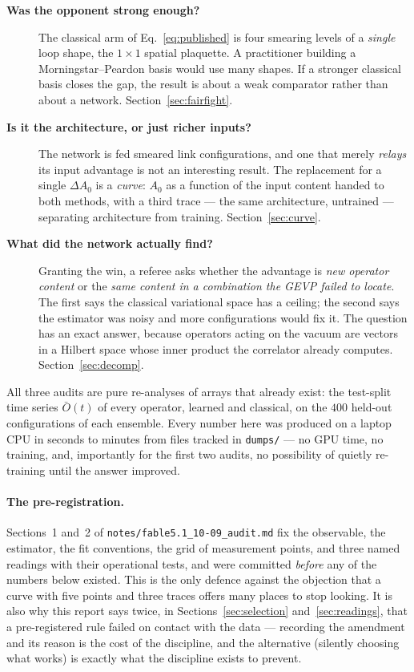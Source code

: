 \documentclass[11pt,a4paper]{article}
\newcommand{\Obar}{\bar{O}}
\newcommand{\Azero}{A_0}
\newcommand{\dAzero}{\Delta A_0}
\begin{document}
\begin{description}
  \item[\textnormal{\textbf{Was the opponent strong enough?}}] The classical arm
        of Eq.~\eqref{eq:published} is four smearing levels of a \emph{single}
        loop shape, the $1\times1$ spatial plaquette. A practitioner building a
        Morningstar--Peardon basis would use many shapes. If a stronger
        classical basis closes the gap, the result is about a weak comparator
        rather than about a network. Section~\ref{sec:fairfight}.
  \item[\textnormal{\textbf{Is it the architecture, or just richer inputs?}}]
        The network is fed smeared link configurations, and one that merely
        \emph{relays} its input advantage is not an interesting result. The
        replacement for a single $\dAzero$ is a \emph{curve}: $\Azero$ as a
        function of the input content handed to both methods, with a third trace
        --- the same architecture, untrained --- separating architecture from
        training. Section~\ref{sec:curve}.
  \item[\textnormal{\textbf{What did the network actually find?}}] Granting the
        win, a referee asks whether the advantage is \emph{new operator content}
        or the \emph{same content in a combination the GEVP failed to locate}.
        The first says the classical variational space has a ceiling; the second
        says the estimator was noisy and more configurations would fix it. The
        question has an exact answer, because operators acting on the vacuum are
        vectors in a Hilbert space whose inner product the correlator already
        computes. Section~\ref{sec:decomp}.
\end{description}

All three audits are pure re-analyses of arrays that already exist: the
test-split time series $\Obar(t)$ of every operator, learned and classical, on
the $400$ held-out configurations of each ensemble. Every number here was
produced on a laptop CPU in seconds to minutes from files tracked in
\texttt{dumps/} --- no GPU time, no training, and, importantly for the first two
audits, no possibility of quietly re-training until the answer improved.

\paragraph{The pre-registration.} Sections~1 and~2 of
\texttt{notes/fable5.1\_10-09\_audit.md} fix the observable, the estimator, the
fit conventions, the grid of measurement points, and three named readings with
their operational tests, and were committed \emph{before} any of the numbers
below existed. This is the only defence against the objection that a curve with
five points and three traces offers many places to stop looking. It is also why
this report says twice, in Sections~\ref{sec:selection} and~\ref{sec:readings},
that a pre-registered rule failed on contact with the data --- recording the
amendment and its reason is the cost of the discipline, and the alternative
(silently choosing what works) is exactly what the discipline exists to
prevent.
\end{document}
